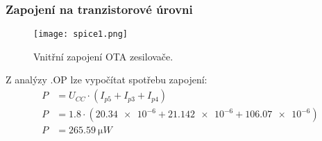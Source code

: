



\subsubsection{Zapojení na tranzistorové úrovni}
    \begin{figure}[h!]
        \centering
        \texttt{[image: spice1.png]}
        \caption{Vnitřní zapojení OTA zesilovače.}
        \label{fig:spice1.png}
    \end{figure}
    
    Z analýzy .OP lze vypočítat spotřebu zapojení:
    \begin{align*}
        P&=U_{CC}\cdot (I_{p5} +I_{p3} +I_{p4} ) \\
        P&=\num{1.8}\cdot (\num{20.34e-6} +\num{21.142e-6} +\num{106.07e-6} ) \\
        P&=\qty{265.59}{\micro W} \\
    \end{align*}
